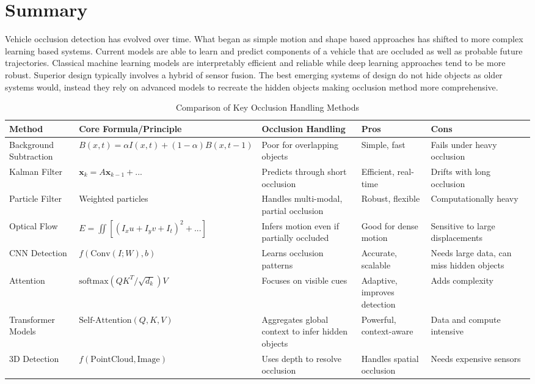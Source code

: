 \documentclass[12pt,a4paper]{report}
\theoremstyle{definition}
\theoremstyle{remark}
\begin{document}
\section{Summary}
Vehicle occlusion detection has evolved over time. What began as simple motion and shape based approaches has shifted to more complex learning based systems. Current models are able to learn and predict components of a vehicle that are occluded as well as probable future trajectories. Classical machine learning models are interpretably efficient and reliable while deep learning approaches tend to be more robust. Superior design typically involves a hybrid of sensor fusion. The best emerging systems of design do not hide objects as older systems would, instead they rely on advanced models to recreate the hidden objects making occlusion method more comprehensive. 
\begin{table}[h]
\centering
\caption{Comparison of Key Occlusion Handling Methods}
\begin{tabular}{|p{2.7cm}|p{4.2cm}|p{2.7cm}|p{2cm}|p{4cm}|}
\hline
\textbf{Method} & \textbf{Core Formula/Principle} & \textbf{Occlusion Handling} & \textbf{Pros} & \textbf{Cons} \\
\hline
Background Subtraction & $B(x, t) = \alpha I(x, t) + (1-\alpha) B(x, t-1)$ & Poor for overlapping objects & Simple, fast & Fails under heavy occlusion \\
\hline
Kalman Filter & $\mathbf{x}_k = A \mathbf{x}_{k-1} + ...$ & Predicts through short occlusion & Efficient, real-time & Drifts with long occlusion \\
\hline
Particle Filter & Weighted particles & Handles multi-modal, partial occlusion & Robust, flexible & Computationally heavy \\
\hline
Optical Flow & $E = \iint [(I_x u + I_y v + I_t)^2 + ...]$ & Infers motion even if partially occluded & Good for dense motion & Sensitive to large displacements \\
\hline
CNN Detection & $f(\text{Conv}(I; W), b)$ & Learns occlusion patterns & Accurate, scalable & Needs large data, can miss hidden objects \\
\hline
Attention & $\text{softmax}(QK^T/\sqrt{d_k})V$ & Focuses on visible cues & Adaptive, improves detection & Adds complexity \\
\hline
Transformer Models & $\text{Self-Attention}(Q, K, V)$ & Aggregates global context to infer hidden objects & Powerful, context-aware & Data and compute intensive \\
\hline
3D Detection & $f(\text{PointCloud}, \text{Image})$ & Uses depth to resolve occlusion & Handles spatial occlusion & Needs expensive sensors \\

\end{tabular}
\end{table}
\end{document}
